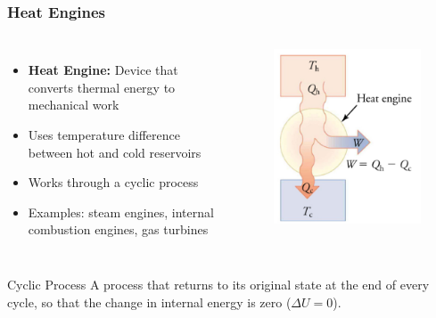 \documentclass{beamer}
\begin{document}
\begin{frame}
    \frametitle{Heat Engines}
    \begin{columns}
        \begin{itemize}
            \item \textbf{Heat Engine:} Device that converts thermal energy to mechanical work
            \item Uses temperature difference between hot and cold reservoirs
            \item Works through a cyclic process
            \item Examples: steam engines, internal combustion engines, gas turbines
        \end{itemize}
        
        \begin{center}
            \begin{figure}
                \centering
                \includegraphics[width=0.7\linewidth]{phys11-thermo-heat-engine-diagram.png}
            \end{figure}
        \end{center}
    \end{columns}
    
    \begin{block}{Cyclic Process}
        A process that returns to its original state at the end of every cycle, so that the change in internal energy is zero ($\Delta U = 0$).
    \end{block}
\end{frame}
\end{document}
